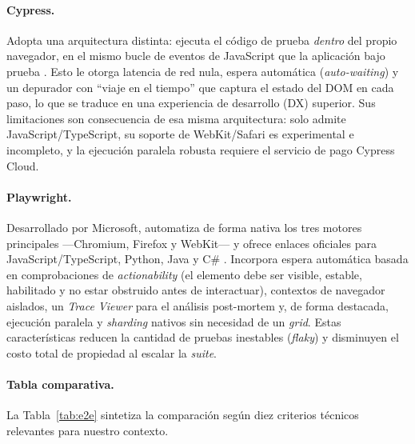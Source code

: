 \documentclass[12pt,a4paper]{article}
\begin{document}
\paragraph{Cypress.}
Adopta una arquitectura distinta: ejecuta el código de prueba \emph{dentro} del propio
navegador, en el mismo bucle de eventos de JavaScript que la aplicación bajo prueba
\citep{cypressdocs}. Esto le otorga latencia de red nula, espera automática
(\textit{auto-waiting}) y un depurador con ``viaje en el tiempo'' que captura el estado
del DOM en cada paso, lo que se traduce en una experiencia de desarrollo (DX) superior.
Sus limitaciones son consecuencia de esa misma arquitectura: solo admite
JavaScript/TypeScript, su soporte de WebKit/Safari es experimental e incompleto, y la
ejecución paralela robusta requiere el servicio de pago Cypress Cloud.

\paragraph{Playwright.}
Desarrollado por Microsoft, automatiza de forma nativa los tres motores principales
---Chromium, Firefox y WebKit--- y ofrece enlaces oficiales para JavaScript/TypeScript,
Python, Java y C\# \citep{playwrightdocs}. Incorpora espera automática basada en
comprobaciones de \textit{actionability} (el elemento debe ser visible, estable, habilitado
y no estar obstruido antes de interactuar), contextos de navegador aislados, un
\textit{Trace Viewer} para el análisis post-mortem y, de forma destacada, ejecución
paralela y \textit{sharding} nativos sin necesidad de un \textit{grid}. Estas
características reducen la cantidad de pruebas inestables (\textit{flaky}) y disminuyen el
costo total de propiedad al escalar la \textit{suite}.

\paragraph{Tabla comparativa.}
La Tabla~\ref{tab:e2e} sintetiza la comparación según diez criterios técnicos relevantes
para nuestro contexto.
\end{document}
